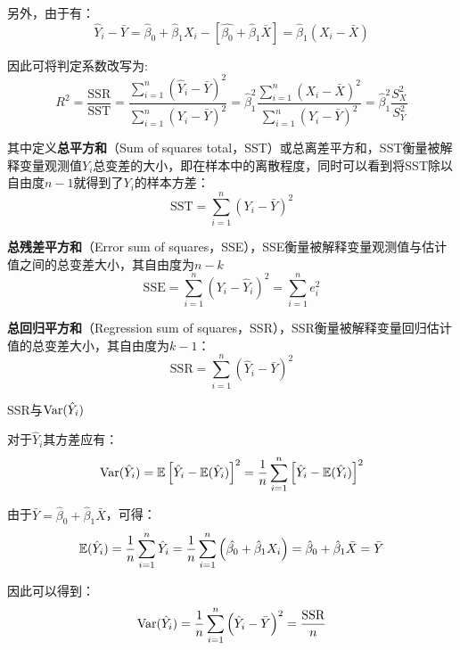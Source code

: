 \documentclass[11pt]{article}
\begin{document}
另外，由于有：
\begin{equation*}
    \hat{Y}_i - \bar{Y} = \hat{\beta}_0 + \hat{\beta}_1 X_i - \left[ \hat{\beta_0} + \hat{\beta}_1 \bar{X} \right] = \hat{\beta}_1 \left( X_i - \bar{X} \right)
\end{equation*}

因此可将判定系数改写为:
\begin{equation*}
    R^2 = \frac{\text{SSR}}{\text{SST}}
    = \frac{\sum_{i=1}^{n} \left( \hat{Y}_i - \bar{Y}\right)^2}{\sum_{i=1}^{n} \left( Y_i - \bar{Y} \right)^2}
    = \hat{\beta}_1^2 \frac{\sum_{i=1}^{n} \left( X_i - \bar{X} \right)^2}{\sum_{i=1}^{n} \left( Y_i - \bar{Y} \right)^2}
    = \hat{\beta}_1^2 \frac{S_X^2}{S_Y^2}
\end{equation*}

其中定义\textbf{总平方和}（Sum of squares total，SST）或总离差平方和，SST衡量被解释变量观测值$Y_i$总变差的大小，即在样本中的离散程度，同时可以看到将SST除以自由度$n-1$就得到了$Y_i$的样本方差：
\begin{equation*}
    \text{SST} = \sum_{i=1}^{n} \left( Y_i - \bar{Y} \right)^2
\end{equation*}

\textbf{总残差平方和}（Error sum of squares，SSE），SSE衡量被解释变量观测值与估计值之间的总变差大小，其自由度为$n-k$
\begin{equation*}
    \text{SSE} = \sum_{i=1}^{n} \left( Y_i - \hat{Y}_i \right)^2
    = \sum_{i=1}^{n} e_i^2
\end{equation*}

\textbf{总回归平方和}（Regression sum of squares，SSR），SSR衡量被解释变量回归估计值的总变差大小，其自由度为$k-1$：
\begin{equation*}
    \text{SSR} = \sum_{i=1}^{n} \left( \hat{Y}_i - \bar{Y} \right)^2
\end{equation*}

\begin{property}
    SSR与$\operatorname{Var}(\hat{Y}_i)$

    对于$\hat{Y}_i$其方差应有：
    \begin{equation*}
        \operatorname{Var}(\hat{Y}_i) = \mathbb{E} \left[ \hat{Y}_i - \mathbb{E}(\hat{Y}_i) \right]^2
        = \frac{1}{n} \sum_{i=1}^{n} \left[ \hat{Y}_i - \mathbb{E}(\hat{Y}_i) \right]^2
    \end{equation*}

    由于$\bar{Y} = \hat{\beta}_0 + \hat{\beta}_1 \bar{X}$，可得：
    \begin{equation*}
        \mathbb{E}(\hat{Y}_i) = \frac{1}{n} \sum_{i=1}^{n} \hat{Y}_i
        = \frac{1}{n} \sum_{i=1}^{n} \left( \hat{\beta_0} + \hat{\beta}_1 X_i \right) = \hat{\beta}_0 + \hat{\beta}_1 \bar{X}
        = \bar{Y}
    \end{equation*}

    因此可以得到：
    \begin{equation*}
        \operatorname{Var}(\hat{Y}_i) = \frac{1}{n} \sum_{i=1}^{n} \left( \hat{Y}_i - \bar{Y} \right)^2 = \frac{\text{SSR}}{n}
    \end{equation*}
\end{property}
\end{document}
